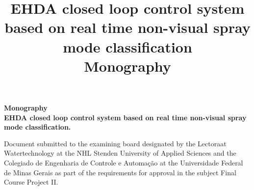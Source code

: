 \begin{titlepage}

\centering
\vspace{2cm}
\textbf{Monography}\\
\vspace{2cm}
\centering
\textbf{EHDA closed loop control system based on real time non-visual spray mode classification.}\\
\vspace{5cm} 

\parbox{1.0\textwidth} 
{\large 
Document submitted to the examining board designated by the Lectoraat Watertechnology at the NHL Stenden University of Applied Sciences and the Colegiado de Engenharia de Controle e Automação at the Universidade Federal de Minas Gerais as part of the requirements for approval in the subject Final Course Project II.}

\vspace{7cm} 

\end{titlepage}



\title{
    EHDA closed loop control system based on real time non-visual spray mode classification \\
    \large Monography}
